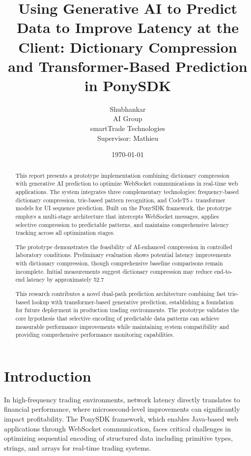 \documentclass[12pt,a4paper]{article}
\title{Using Generative AI to Predict Data to Improve Latency at the Client: Dictionary Compression and Transformer-Based Prediction in PonySDK}
\author{Shubhankar\\AI Group\\smartTrade Technologies\\Supervisor: Mathieu}
\date{\today}
\begin{document}
\maketitle

\begin{abstract}
This report presents a prototype implementation combining dictionary compression with generative AI prediction to optimize WebSocket communications in real-time web applications. The system integrates three complementary technologies: frequency-based dictionary compression, trie-based pattern recognition, and CodeT5+ transformer models for UI sequence prediction. Built on the PonySDK framework, the prototype employs a multi-stage architecture that intercepts WebSocket messages, applies selective compression to predictable patterns, and maintains comprehensive latency tracking across all optimization stages.

The prototype demonstrates the feasibility of AI-enhanced compression in controlled laboratory conditions. Preliminary evaluation shows potential latency improvements with dictionary compression, though comprehensive baseline comparisons remain incomplete. Initial measurements suggest dictionary compression may reduce end-to-end latency by approximately 52.7%

This research contributes a novel dual-path prediction architecture combining fast trie-based lookup with transformer-based generative prediction, establishing a foundation for future deployment in production trading environments. The prototype validates the core hypothesis that selective encoding of predictable data patterns can achieve measurable performance improvements while maintaining system compatibility and providing comprehensive performance monitoring capabilities.
\end{abstract}

\tableofcontents
\newpage

\section{Introduction}

In high-frequency trading environments, network latency directly translates to financial performance, where microsecond-level improvements can significantly impact profitability. The PonySDK framework, which enables Java-based web applications through WebSocket communication, faces critical challenges in optimizing sequential encoding of structured data including primitive types, strings, and arrays for real-time trading systems.
\end{document}
